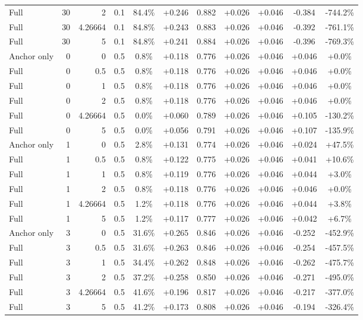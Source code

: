 \begin{table}[htbp]
\begin{tabular}{lrrrccccccc}
Full & 30 & 2 & 0.1 & 84.4\% & +0.246 & 0.882 & +0.026 & +0.046 & -0.384 & -744.2\% \\
Full & 30 & 4.26664 & 0.1 & 84.8\% & +0.243 & 0.883 & +0.026 & +0.046 & -0.392 & -761.1\% \\
Full & 30 & 5 & 0.1 & 84.8\% & +0.241 & 0.884 & +0.026 & +0.046 & -0.396 & -769.3\% \\
Anchor only & 0 & 0 & 0.5 & 0.8\% & +0.118 & 0.776 & +0.026 & +0.046 & +0.046 & +0.0\% \\
Full & 0 & 0.5 & 0.5 & 0.8\% & +0.118 & 0.776 & +0.026 & +0.046 & +0.046 & +0.0\% \\
Full & 0 & 1 & 0.5 & 0.8\% & +0.118 & 0.776 & +0.026 & +0.046 & +0.046 & +0.0\% \\
Full & 0 & 2 & 0.5 & 0.8\% & +0.118 & 0.776 & +0.026 & +0.046 & +0.046 & +0.0\% \\
Full & 0 & 4.26664 & 0.5 & 0.0\% & +0.060 & 0.789 & +0.026 & +0.046 & +0.105 & -130.2\% \\
Full & 0 & 5 & 0.5 & 0.0\% & +0.056 & 0.791 & +0.026 & +0.046 & +0.107 & -135.9\% \\
Anchor only & 1 & 0 & 0.5 & 2.8\% & +0.131 & 0.774 & +0.026 & +0.046 & +0.024 & +47.5\% \\
Full & 1 & 0.5 & 0.5 & 0.8\% & +0.122 & 0.775 & +0.026 & +0.046 & +0.041 & +10.6\% \\
Full & 1 & 1 & 0.5 & 0.8\% & +0.119 & 0.776 & +0.026 & +0.046 & +0.044 & +3.0\% \\
Full & 1 & 2 & 0.5 & 0.8\% & +0.118 & 0.776 & +0.026 & +0.046 & +0.046 & +0.0\% \\
Full & 1 & 4.26664 & 0.5 & 1.2\% & +0.118 & 0.776 & +0.026 & +0.046 & +0.044 & +3.8\% \\
Full & 1 & 5 & 0.5 & 1.2\% & +0.117 & 0.777 & +0.026 & +0.046 & +0.042 & +6.7\% \\
Anchor only & 3 & 0 & 0.5 & 31.6\% & +0.265 & 0.846 & +0.026 & +0.046 & -0.252 & -452.9\% \\
Full & 3 & 0.5 & 0.5 & 31.6\% & +0.263 & 0.846 & +0.026 & +0.046 & -0.254 & -457.5\% \\
Full & 3 & 1 & 0.5 & 34.4\% & +0.262 & 0.848 & +0.026 & +0.046 & -0.262 & -475.7\% \\
Full & 3 & 2 & 0.5 & 37.2\% & +0.258 & 0.850 & +0.026 & +0.046 & -0.271 & -495.0\% \\
Full & 3 & 4.26664 & 0.5 & 41.6\% & +0.196 & 0.817 & +0.026 & +0.046 & -0.217 & -377.0\% \\
Full & 3 & 5 & 0.5 & 41.2\% & +0.173 & 0.808 & +0.026 & +0.046 & -0.194 & -326.4\% \\

\end{tabular}
\end{table}
